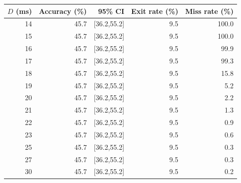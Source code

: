 \begin{tabular}{rrrrr}
\toprule
$D$ (ms) & Accuracy (\%) & 95\% CI & Exit rate (\%) & Miss rate (\%) \\
\midrule
14 & 45.7 & [36.2,55.2] & 9.5 & 100.0 \\
15 & 45.7 & [36.2,55.2] & 9.5 & 100.0 \\
16 & 45.7 & [36.2,55.2] & 9.5 & 99.9 \\
17 & 45.7 & [36.2,55.2] & 9.5 & 99.3 \\
18 & 45.7 & [36.2,55.2] & 9.5 & 15.8 \\
19 & 45.7 & [36.2,55.2] & 9.5 & 5.2 \\
20 & 45.7 & [36.2,55.2] & 9.5 & 2.2 \\
21 & 45.7 & [36.2,55.2] & 9.5 & 1.3 \\
22 & 45.7 & [36.2,55.2] & 9.5 & 0.9 \\
23 & 45.7 & [36.2,55.2] & 9.5 & 0.6 \\
25 & 45.7 & [36.2,55.2] & 9.5 & 0.3 \\
27 & 45.7 & [36.2,55.2] & 9.5 & 0.3 \\
30 & 45.7 & [36.2,55.2] & 9.5 & 0.2 \\
\bottomrule
\end{tabular}
